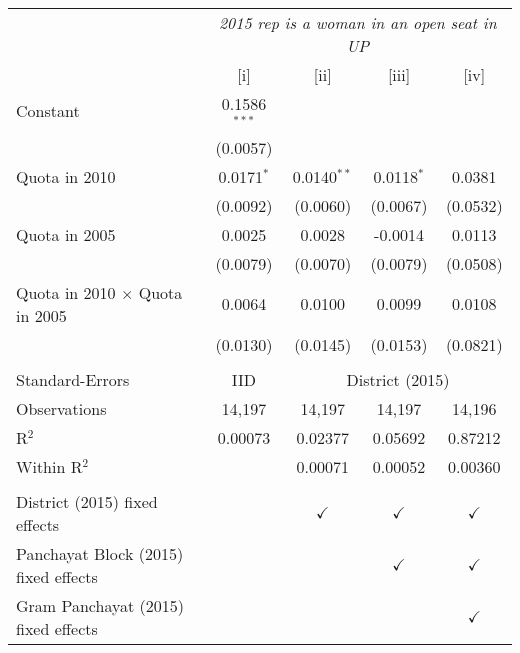 
\begingroup
\centering
\begin{tabular}{lcccc}
   \toprule
    & \multicolumn{4}{c}{\textit{2015 rep is a woman in an open seat in UP}}\\
                                         & [i]            & [ii]          & [iii]         & [iv]\\  
   \midrule 
   Constant                              & 0.1586$^{***}$ &               &               &   \\   
                                         & (0.0057)       &               &               &   \\   
   Quota in 2010                         & 0.0171$^{*}$   & 0.0140$^{**}$ & 0.0118$^{*}$  & 0.0381\\   
                                         & (0.0092)       & (0.0060)      & (0.0067)      & (0.0532)\\   
   Quota in 2005                         & 0.0025         & 0.0028        & -0.0014       & 0.0113\\   
                                         & (0.0079)       & (0.0070)      & (0.0079)      & (0.0508)\\   
   Quota in 2010 $\times$ Quota in 2005  & 0.0064         & 0.0100        & 0.0099        & 0.0108\\   
                                         & (0.0130)       & (0.0145)      & (0.0153)      & (0.0821)\\   
    \\
   Standard-Errors & IID & \multicolumn{3}{c}{District (2015)} \\ 
   Observations                          & 14,197         & 14,197        & 14,197        & 14,196\\  
   R$^2$                                 & 0.00073        & 0.02377       & 0.05692       & 0.87212\\  
   Within R$^2$                          &                & 0.00071       & 0.00052       & 0.00360\\  
    \\
   District (2015) fixed effects         &                & $\checkmark$  & $\checkmark$  & $\checkmark$\\   
   Panchayat Block (2015) fixed effects  &                &               & $\checkmark$  & $\checkmark$\\   
   Gram Panchayat (2015) fixed effects   &                &               &               & $\checkmark$\\   
   \bottomrule
\end{tabular}
\par\endgroup


